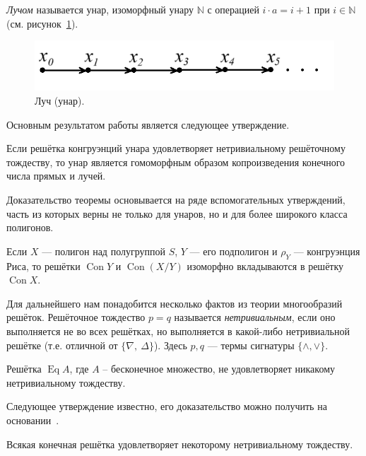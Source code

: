 \documentclass[11pt,twoside,final
]{article}
\def\Con{\operatorname{Con}}
\def\Eq{\operatorname{Eq}}
\begin{document}
\textit{Лучом} называется унар, изоморфный унару $\mathbb{N}$ с операцией $i \cdot a = i + 1$ при $i \in \mathbb{N}$ (см. рисунок~\ref{fig:ray}).
\begin{figure}[ht!]
	\centering
	\includegraphics[scale=0.5]{img/ray.png}
	\caption{Луч (унар).}
	\label{fig:ray}
\end{figure}

Основным результатом работы является следующее утверждение.
\begin{theorem} \label{thm:main}
	Если решётка конгруэнций унара удовлетворяет нетривиальному решёточному тождеству, то унар является гомоморфным образом копроизведения конечного числа прямых и лучей.
\end{theorem}

Доказательство теоремы основывается на ряде вспомогательных утверждений, часть из которых верны не только для унаров, но и для более широкого класса полигонов.
\begin{lemma} \label{lemma:1}
	Если $X$ — полигон над полугруппой $S$, $Y$ — его подполигон и $\rho_Y$ — конгруэнция Риса, то решётки $\Con Y$ и $\Con (X/Y)$ изоморфно вкладываются в решётку $\Con X$.
\end{lemma}

Для дальнейшего нам понадобится несколько фактов из теории многообразий решёток.
Решёточное тождество $p = q$ называется \textit{нетривиальным}, если оно выполняется не во всех решётках, но выполняется в какой-либо нетривиальной решётке (т.е. отличной от $\{\nabla,\ \Delta\}$).
Здесь $p,q$ — термы сигнатуры $\{ \land , \lor \}$.

\begin{lemma} \label{lemma:2}
	Решётка $\Eq A$, где $A$ -- бесконечное множество, не удовлетворяет никакому нетривиальному тождеству.
\end{lemma}

Следующее утверждение известно, его доказательство можно получить на основании~\cite[следствие 3.14 и теорема 8 главы VI]{Kohn_9}.
\begin{lemma}\label{lemma:3}
	Всякая конечная решётка удовлетворяет некоторому нетривиальному тождеству.
\end{lemma}
\end{document}
